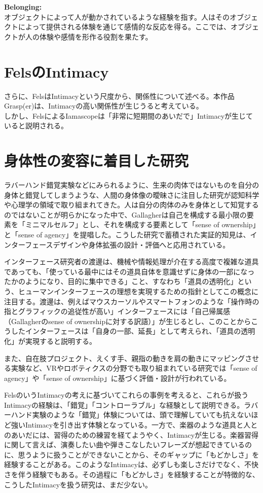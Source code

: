 \textbf{Belonging:}\\
オブジェクトによって人が動かされているような経験を指す。人はそのオブジェクトによって提供される体験を通じて感情的な反応を得る。ここでは、オブジェクトが人の体験や感情を形作る役割を果たす。

\section{FelsのIntimacy}
さらに、FelsはIntimacyという尺度から、関係性について述べる。本作品Grasp(er)は、Intimacyの高い関係性が生じうると考えている。\\
しかし、FelsによるIamascopeは「非常に短期間のあいだで」Intimacyが生じていると説明される。

\section{身体性の変容に着目した研究}
ラバーハンド錯覚実験などにみられるように、生来の肉体ではないものを自分の身体と錯覚してしまうような、人間の身体像の曖昧さに注目した研究が認知科学や心理学の領域で取り組まれてきた。人は自分の肉体のみを身体として知覚するのではないことが明らかになった中で、Gallagher\cite{Gallagher2000}は自己を構成する最小限の要素を「ミニマルセルフ」とし、それを構成する要素として「sense of ownership」と「sense of agency」を提唱した。こうした研究で蓄積された実証的知見は、インターフェースデザインや身体拡張の設計・評価へと応用されている。

インターフェース研究者の渡邊は、機械や情報処理が介在する高度で複雑な道具であっても、「使っている最中にはその道具自体を意識せずに身体の一部になったかのようになり、目的に集中できる」こと、すなわち「道具の透明化」という、ヒューマンインターフェースの理想を実現するための指針としてこの概念に注目する。渡邊は、例えばマウスカーソルやスマートフォンのような「操作時の指とグラフィックの追従性が高い」インターフェースには「自己帰属感（Gallagherのsense of ownershipに対する訳語）」が生じるとし、このことからこうしたインターフェースは「自身の一部、延長」として考えられ、「道具の透明化」が実現すると説明する\cite{Watanabe2013}。

また、自在肢プロジェクト、えくす手、親指の動きを肩の動きにマッピングさせる実験など、VRやロボティクスの分野でも取り組まれている研究では「sense of agency」や「sense of ownership」に基づく評価・設計が行われている。

FelsのいうIntimacyの考えに基づいてこれらの事例を考えると、これらが扱うIntimacyの経験は、「錯覚」「コントローラブル」な経験として説明できる。ラバーハンド実験のような「錯覚」体験については、頭で理解していても抗えないほど強いIntimacyを引き出す体験となっている。一方で、楽器のような道具と人とのあいだには、習得のための練習を経てようやく、Intimacyが生じる。楽器習得に関して言えば、演奏したい曲や弾きこなしたいフレーズが想起できているのに、思うように扱うことができないことから、そのギャップに「もどかしさ」を経験することがある。このようなIntimacyは、必ずしも楽しさだけでなく、不快さを伴う経験でもある。その過程に「もどかしさ」を経験することが特徴的な、こうしたIntimacyを扱う研究は、まだ少ない。


